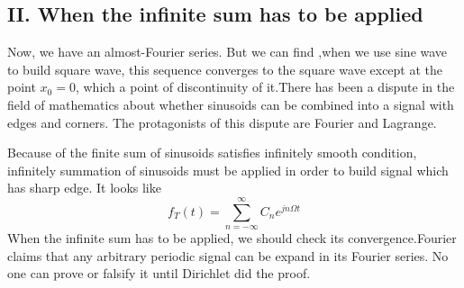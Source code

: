 \documentclass[margin,line]{res}
\begin{document}
\begin{resume}
\section{\sc II. When the infinite sum has to be applied}
Now, we have an almost-Fourier series. But we can find ,when we use sine wave to build square wave, this sequence converges to the square wave except at the point $x_0 = 0$, which a point of discontinuity of it.There has been a dispute in the field of mathematics about whether sinusoids can be combined into a signal with edges and corners. The protagonists of this dispute are Fourier and Lagrange. \par
Because of the finite sum of sinusoids satisfies infinitely smooth condition, infinitely summation of sinusoids must be applied in order to build signal which has sharp edge. It looks like 
$$
f_T(t) = \sum\limits_{n=-\infty}^{\infty} {C_n e^{jn\Omega t}}
$$
When the infinite sum has to be applied, we should check its convergence.Fourier claims that any arbitrary periodic signal can be expand in its Fourier series. No one can prove or falsify it until Dirichlet did the proof. \par


\end{resume}
\end{document}
